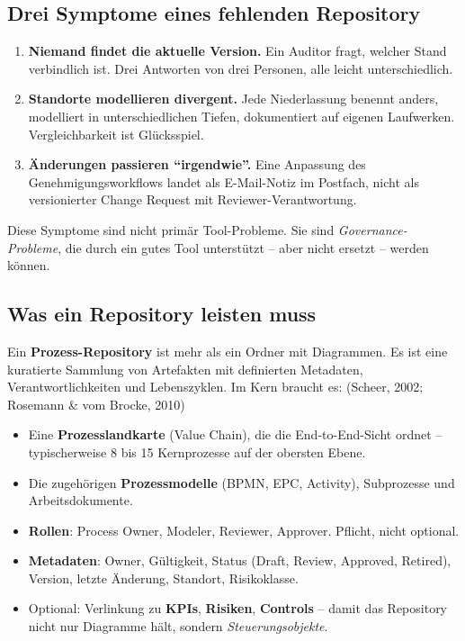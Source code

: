 \documentclass[11pt,a4paper,oneside]{article}
\newcommand{\fachbegriff}[1]{\textbf{#1}}
\newcommand{\quelle}[1]{{\footnotesize\color{lpGray}(#1)}}
\begin{document}
\subsection{Drei Symptome eines fehlenden Repository}

\begin{enumerate}
  \item \fachbegriff{Niemand findet die aktuelle Version.} Ein Auditor fragt, welcher Stand verbindlich ist. Drei Antworten von drei Personen, alle leicht unterschiedlich.
  \item \fachbegriff{Standorte modellieren divergent.} Jede Niederlassung benennt anders, modelliert in unterschiedlichen Tiefen, dokumentiert auf eigenen Laufwerken. Vergleichbarkeit ist Glücksspiel.
  \item \fachbegriff{Änderungen passieren ``irgendwie''.} Eine Anpassung des Genehmigungsworkflows landet als E-Mail-Notiz im Postfach, nicht als versionierter Change Request mit Reviewer-Verantwortung.
\end{enumerate}

Diese Symptome sind nicht primär Tool-Probleme. Sie sind \emph{Governance-Probleme}, die durch ein gutes Tool unterstützt -- aber nicht ersetzt -- werden können.

\subsection{Was ein Repository leisten muss}

Ein \fachbegriff{Prozess-Repository} ist mehr als ein Ordner mit Diagrammen. Es ist eine kuratierte Sammlung von Artefakten mit definierten Metadaten, Verantwortlichkeiten und Lebenszyklen. Im Kern braucht es: \quelle{Scheer, 2002; Rosemann \& vom Brocke, 2010}

\begin{itemize}
  \item Eine \fachbegriff{Prozesslandkarte} (Value Chain), die die End-to-End-Sicht ordnet -- typischerweise 8 bis 15 Kernprozesse auf der obersten Ebene.
  \item Die zugehörigen \fachbegriff{Prozessmodelle} (BPMN, EPC, Activity), Subprozesse und Arbeitsdokumente.
  \item \fachbegriff{Rollen}: Process Owner, Modeler, Reviewer, Approver. Pflicht, nicht optional.
  \item \fachbegriff{Metadaten}: Owner, Gültigkeit, Status (Draft, Review, Approved, Retired), Version, letzte Änderung, Standort, Risikoklasse.
  \item Optional: Verlinkung zu \fachbegriff{KPIs}, \fachbegriff{Risiken}, \fachbegriff{Controls} -- damit das Repository nicht nur Diagramme hält, sondern \emph{Steuerungsobjekte}.
\end{itemize}
\end{document}
